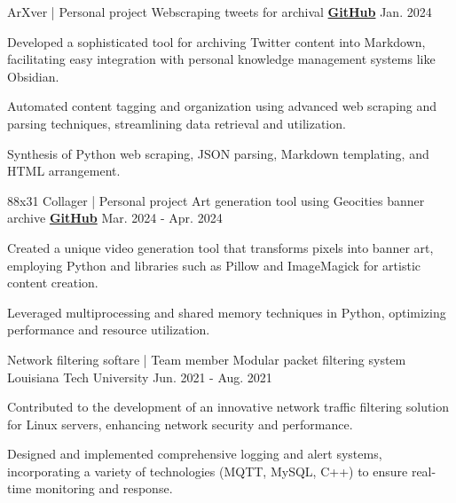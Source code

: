 \begin{cventries}
\cventry
{ArXver | Personal project} %
{Webscraping tweets for archival} %
{\href{https://github.com/JohnnySn0w/ArXver}{\textbf{GitHub}}} %
{Jan. 2024} %
{
  \begin{cvitems} %
    \item{Developed a sophisticated tool for archiving Twitter content into Markdown, facilitating easy integration with personal knowledge management systems like Obsidian.}
    \item{Automated content tagging and organization using advanced web scraping and parsing techniques, streamlining data retrieval and utilization.}
    \item{Synthesis of Python web scraping, JSON parsing, Markdown templating, and HTML arrangement.}
  \end{cvitems}
}

\cventry
{88x31 Collager | Personal project} %
{Art generation tool using Geocities banner archive} %
{\href{https://github.com/JohnnySn0w/8831-collager}{\textbf{GitHub}}} %
{Mar. 2024 - Apr. 2024} %
{
  \begin{cvitems} %
    \item{Created a unique video generation tool that transforms pixels into banner art, employing Python and libraries such as Pillow and ImageMagick for artistic content creation.}
    \item{Leveraged multiprocessing and shared memory techniques in Python, optimizing performance and resource utilization.}
  \end{cvitems}
}

\cventry
{Network filtering softare | Team member} %
{Modular packet filtering system} %
{Louisiana Tech University} %
{Jun. 2021 - Aug. 2021} %
{
    \begin{cvitems} %
        \item{Contributed to the development of an innovative network traffic filtering solution for Linux servers, enhancing network security and performance.}
        \item{Designed and implemented comprehensive logging and alert systems, incorporating a variety of technologies (MQTT, MySQL, C++) to ensure real-time monitoring and response.}
    \end{cvitems}
}


\end{cventries}
